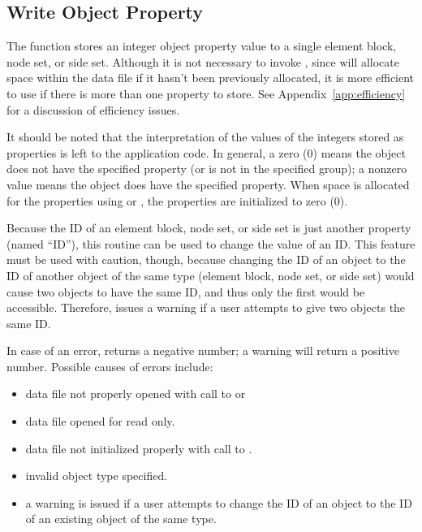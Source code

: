 \subsection{Write Object Property}

The function  stores an integer object property
value to a single element block, node set, or side set. Although it is
not necessary to invoke , since
 will allocate space within the data file if it
hasn't been previously allocated, it is more efficient to use
 if there is more than one property to
store. See Appendix~\ref{app:efficiency} for a discussion of
efficiency issues.


It should be noted that the interpretation of the values 
of the integers stored as properties is left to the application 
code. In general, a zero (0) means the object does not have the 
specified property (or is not in the specified group); a nonzero 
value means the object does have the specified property. When 
space is allocated for the properties using  
or , the properties are initialized to 
zero (0).


Because the ID of an element block, node set, or side set 
is just another property (named ``ID''), this routine can be used 
to change the value of an ID. This feature must be used with 
caution, though, because changing the ID of an object to the 
ID of another object of the same type (element block, node set, 
or side set) would cause two objects to have the same ID, and 
thus only the first would be accessible. Therefore,  
issues a warning if a user attempts to give two objects the 
same ID.


In case of an error,  returns a negative 
number; a warning will return a positive number. 
Possible causes of errors include:

\begin{itemize}
 \item data file not properly opened with call to 
 or 

 \item data file opened for read only.

 \item data file not initialized properly with call to
 .

 \item invalid object type specified.

 \item a warning is issued if a user attempts to change the ID of an
 object to the ID of an existing object of the same type.
\end{itemize}

